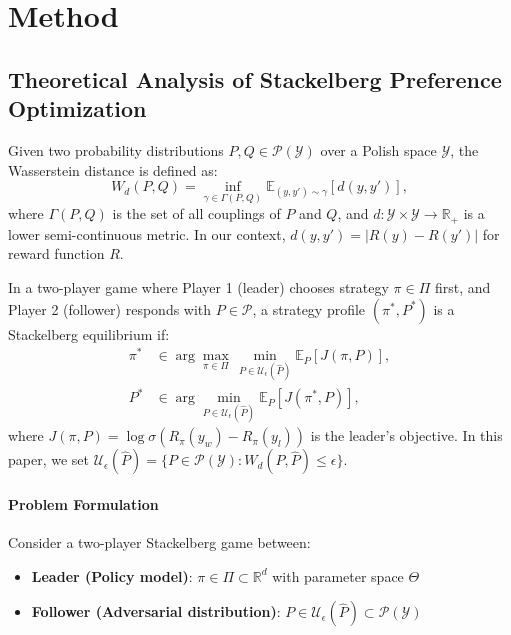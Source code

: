 \section{Method}
\subsection{Theoretical Analysis of Stackelberg Preference Optimization}
\begin{definition}
\label{def:wasserstein}
Given two probability distributions \( P, Q \in \mathcal{P}(\mathcal{Y}) \) over a Polish space \( \mathcal{Y} \), the Wasserstein distance is defined as:
\[
W_d(P, Q) = \inf_{\gamma \in \Gamma(P, Q)} \mathbb{E}_{(y, y') \sim \gamma} \left[ d(y, y') \right],
\]
where \( \Gamma(P, Q) \) is the set of all couplings of \( P \) and \( Q \), and \( d: \mathcal{Y} \times \mathcal{Y} \to \mathbb{R}_+ \) is a lower semi-continuous metric. In our context, \( d(y, y') = | R(y) - R(y')| \) for reward function \( R \).
\end{definition}

\begin{definition}
\label{def:stackelberg}
In a two-player game where Player 1 (leader) chooses strategy \( \pi \in \Pi \) first, and Player 2 (follower) responds with \( P \in \mathcal{P} \), a strategy profile \( (\pi^*, P^*) \) is a Stackelberg equilibrium if:
\begin{align}
\pi^* &\in \arg\max_{\pi \in \Pi} \, \min_{P \in \mathcal{U}_\epsilon(\hat{P})} \mathbb{E}_{P}[J(\pi, P)], \\
P^* &\in \arg\min_{P \in \mathcal{U}_\epsilon(\hat{P})} \mathbb{E}_{P}[J(\pi^*, P)],
\end{align}
where \( J(\pi, P) = \log\sigma(R_\pi(y_w) - R_\pi(y_l)) \) is the leader's objective. In this paper, we set \( \mathcal{U}_\epsilon(\hat{P}) = \{ P \in \mathcal{P}(\mathcal{Y}) : W_d(P, \hat{P}) \leq \epsilon \} \).
\end{definition}

\paragraph{Problem Formulation}
Consider a two-player Stackelberg game between:
\begin{itemize}
    \item \textbf{Leader (Policy model)}: \(\pi \in \Pi \subset \mathbb{R}^d\) with parameter space \(\Theta\)
    \item \textbf{Follower (Adversarial distribution)}: \(P \in \mathcal{U}_\epsilon(\hat{P}) \subset \mathcal{P}(\mathcal{Y})\)
\end{itemize}

